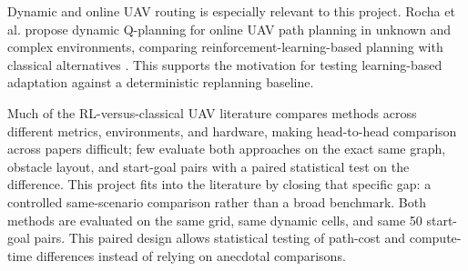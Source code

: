 Dynamic and online UAV routing is especially relevant to this project. Rocha et al. propose dynamic Q-planning for online UAV path planning in unknown and complex environments, comparing reinforcement-learning-based planning with classical alternatives \cite{rocha2024dynamic}. This supports the motivation for testing learning-based adaptation against a deterministic replanning baseline.

Much of the RL-versus-classical UAV literature compares methods across different metrics, environments, and hardware, making head-to-head comparison across papers difficult; few evaluate both approaches on the exact same graph, obstacle layout, and start-goal pairs with a paired statistical test on the difference. This project fits into the literature by closing that specific gap: a controlled same-scenario comparison rather than a broad benchmark. Both methods are evaluated on the same grid, same dynamic cells, and same 50 start-goal pairs. This paired design allows statistical testing of path-cost and compute-time differences instead of relying on anecdotal comparisons.

